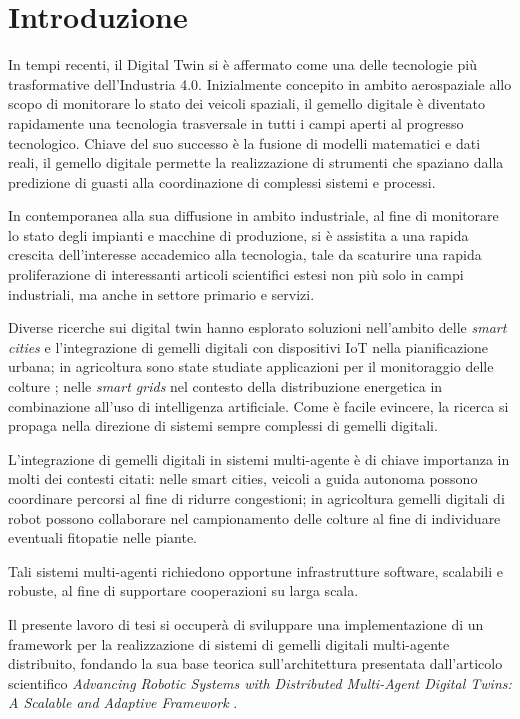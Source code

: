 \chapter{Introduzione}

In tempi recenti, il Digital Twin si è affermato come una delle tecnologie più trasformative dell'Industria 4.0.
\noindent Inizialmente concepito in ambito aerospaziale allo scopo di monitorare lo stato dei veicoli spaziali, il gemello digitale è diventato rapidamente una tecnologia trasversale in tutti i campi aperti al progresso tecnologico. Chiave del suo successo è la fusione di modelli matematici e dati reali, il gemello digitale permette la realizzazione di strumenti che spaziano dalla predizione di guasti alla coordinazione di complessi sistemi e processi.

In contemporanea alla sua diffusione in ambito industriale, al fine di monitorare lo stato degli impianti e macchine di produzione, si è assistita a una rapida crescita dell'interesse accademico alla tecnologia, tale da scaturire una rapida proliferazione di interessanti articoli scientifici estesi non più solo in campi industriali, ma anche in settore primario e servizi.

Diverse ricerche sui digital twin hanno esplorato soluzioni nell'ambito delle \textit{smart cities} \cite{dt_smart_cities} e l'integrazione di gemelli digitali con dispositivi IoT nella pianificazione urbana; in agricoltura sono state studiate applicazioni per il monitoraggio delle colture \cite{dt_agricolture}; nelle \textit{smart grids} \cite{smartgerudo} nel contesto della distribuzione energetica in combinazione all'uso di intelligenza artificiale. Come è facile evincere, la ricerca si propaga nella direzione di sistemi sempre complessi di gemelli digitali.

L'integrazione di gemelli digitali in sistemi multi-agente è di chiave importanza in molti dei contesti citati: nelle smart cities, veicoli a guida autonoma possono coordinare percorsi al fine di ridurre congestioni; in agricoltura gemelli digitali di robot possono collaborare nel campionamento delle colture al fine di individuare eventuali fitopatie nelle piante.

Tali sistemi multi-agenti richiedono opportune infrastrutture software, scalabili e robuste, al fine di supportare cooperazioni su larga scala.


Il presente lavoro di tesi si occuperà di sviluppare una implementazione di un framework per la realizzazione di sistemi di gemelli digitali multi-agente distribuito, fondando la sua base teorica sull'architettura presentata dall'articolo scientifico \textit{Advancing Robotic Systems with Distributed Multi-Agent Digital Twins: A Scalable and Adaptive Framework} \cite{Russo2025}.

